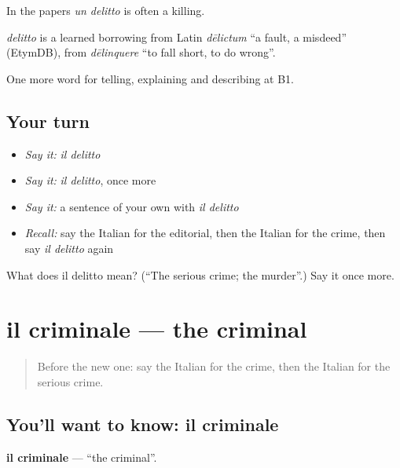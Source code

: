 In the papers \emph{un delitto} is often a killing.

\begin{cousinweb}
\emph{delitto} is a learned borrowing from Latin \emph{dēlictum} \textquotedblleft{}a fault, a misdeed\textquotedblright{} (EtymDB), from \emph{dēlinquere} \textquotedblleft{}to fall short, to do wrong\textquotedblright{}.
\end{cousinweb}

\begin{grammarlens}[title={What you've built}]
One more word for telling, explaining and describing at B1.
\end{grammarlens}

\subsection*{Your turn}
\begin{itemize}
\raggedright
  \item \emph{Say it:} \emph{il delitto}
  \item \emph{Say it:} \emph{il delitto}, once more
  \item \emph{Say it:} a sentence of your own with \emph{il delitto}
  \item \emph{Recall:} say the Italian for the editorial, then the Italian for the crime, then say \emph{il delitto} again
\end{itemize}

\begin{tcolorbox}[breakable,colback=teal!4,colframe=teal!35!black,title={Before you move on}]
What does il delitto mean? (\textquotedblleft{}The serious crime; the murder\textquotedblright{}.) Say it once more.
\end{tcolorbox}
\section[il criminale]{il criminale — the criminal}

\label{lesson:IT-C290-criminale}



\begin{quote}
Before the new one: say the Italian for the crime, then the Italian for the serious crime.
\end{quote}

\subsection*{You'll want to know: il criminale}
\textbf{il criminale} — \textquotedblleft{}the criminal\textquotedblright{}.

